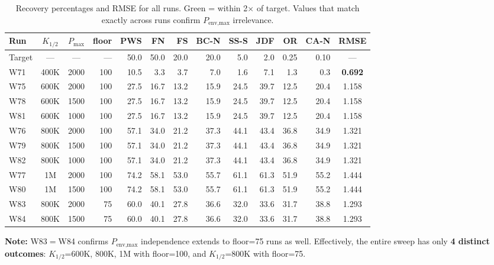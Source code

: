 \documentclass[11pt,a4paper]{article}
\begin{document}
\begin{table}[H]
\centering
\caption{Recovery percentages and RMSE for all runs. \textcolor{okgreen}{Green} = within 2$\times$ of target. Values that match exactly across runs confirm $P_{\text{env,max}}$ irrelevance.}
\label{tab:results}
\small
\begin{tabular}{lccr|rrrrrrrr|c}
\toprule
\textbf{Run} & $K_{1/2}$ & $P_{\text{max}}$ & \textbf{floor} & \textbf{PWS} & \textbf{FN} & \textbf{FS} & \textbf{BC-N} & \textbf{SS-S} & \textbf{JDF} & \textbf{OR} & \textbf{CA-N} & \textbf{RMSE} \\
\midrule
Target & --- & --- & --- & 50.0 & 50.0 & 20.0 & 20.0 & 5.0 & 2.0 & 0.25 & 0.10 & --- \\
\midrule
W71 & 400K & 2000 & 100 & 10.5 & 3.3 & 3.7 & 7.0 & 1.6 & 7.1 & 1.3 & 0.3 & \textbf{0.692} \\
\midrule
W75 & 600K & 2000 & 100 & 27.5 & 16.7 & 13.2 & 15.9 & 24.5 & 39.7 & 12.5 & 20.4 & 1.158 \\
W78 & 600K & 1500 & 100 & 27.5 & 16.7 & 13.2 & 15.9 & 24.5 & 39.7 & 12.5 & 20.4 & 1.158 \\
W81 & 600K & 1000 & 100 & 27.5 & 16.7 & 13.2 & 15.9 & 24.5 & 39.7 & 12.5 & 20.4 & 1.158 \\
\midrule
W76 & 800K & 2000 & 100 & \textcolor{okgreen}{57.1} & 34.0 & \textcolor{okgreen}{21.2} & 37.3 & 44.1 & 43.4 & 36.8 & 34.9 & 1.321 \\
W79 & 800K & 1500 & 100 & \textcolor{okgreen}{57.1} & 34.0 & \textcolor{okgreen}{21.2} & 37.3 & 44.1 & 43.4 & 36.8 & 34.9 & 1.321 \\
W82 & 800K & 1000 & 100 & \textcolor{okgreen}{57.1} & 34.0 & \textcolor{okgreen}{21.2} & 37.3 & 44.1 & 43.4 & 36.8 & 34.9 & 1.321 \\
\midrule
W77 & 1M & 2000 & 100 & 74.2 & \textcolor{okgreen}{58.1} & 53.0 & 55.7 & 61.1 & 61.3 & 51.9 & 55.2 & 1.444 \\
W80 & 1M & 1500 & 100 & 74.2 & \textcolor{okgreen}{58.1} & 53.0 & 55.7 & 61.1 & 61.3 & 51.9 & 55.2 & 1.444 \\
\midrule
W83 & 800K & 2000 & 75 & \textcolor{okgreen}{60.0} & 40.1 & 27.8 & 36.6 & 32.0 & 33.6 & 31.7 & 38.8 & 1.293 \\
W84 & 800K & 1500 & 75 & \textcolor{okgreen}{60.0} & 40.1 & 27.8 & 36.6 & 32.0 & 33.6 & 31.7 & 38.8 & 1.293 \\
\bottomrule
\end{tabular}
\end{table}

\textbf{Note:} W83$=$W84 confirms $P_{\text{env,max}}$ independence extends to floor=75 runs as well. Effectively, the entire sweep has only \textbf{4 distinct outcomes}: $K_{1/2}$=600K, 800K, 1M with floor=100, and $K_{1/2}$=800K with floor=75.
\end{document}
